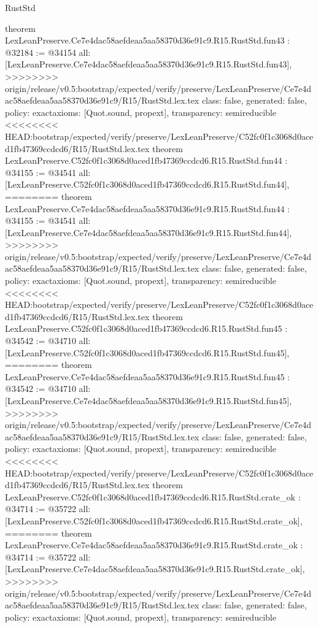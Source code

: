 \begin{lexlean}{RustStd}
\begin{coremodule}
{\begin{coremodule}
{{{{{{{{{{{{{{{{{{{{{{{{{{{{{{{{{{{{{{{{{{{{{{theorem LexLeanPreserve.Ce7e4dac58aefdeaa5aa58370d36e91c9.R15.RustStd.fun43 : @32184 := @34154 {
  all: [LexLeanPreserve.Ce7e4dac58aefdeaa5aa58370d36e91c9.R15.RustStd.fun43],
>>>>>>>> origin/release/v0.5:bootstrap/expected/verify/preserve/LexLeanPreserve/Ce7e4dac58aefdeaa5aa58370d36e91c9/R15/RustStd.lex.tex
  class: false,
  generated: false,
  policy: exact{axioms: [Quot.sound, propext]},
  transparency: semireducible
}
<<<<<<<< HEAD:bootstrap/expected/verify/preserve/LexLeanPreserve/C52fc0f1c3068d0aced1fb47369ccdcd6/R15/RustStd.lex.tex
theorem LexLeanPreserve.C52fc0f1c3068d0aced1fb47369ccdcd6.R15.RustStd.fun44 : @34155 := @34541 {
  all: [LexLeanPreserve.C52fc0f1c3068d0aced1fb47369ccdcd6.R15.RustStd.fun44],
========
theorem LexLeanPreserve.Ce7e4dac58aefdeaa5aa58370d36e91c9.R15.RustStd.fun44 : @34155 := @34541 {
  all: [LexLeanPreserve.Ce7e4dac58aefdeaa5aa58370d36e91c9.R15.RustStd.fun44],
>>>>>>>> origin/release/v0.5:bootstrap/expected/verify/preserve/LexLeanPreserve/Ce7e4dac58aefdeaa5aa58370d36e91c9/R15/RustStd.lex.tex
  class: false,
  generated: false,
  policy: exact{axioms: [Quot.sound, propext]},
  transparency: semireducible
}
<<<<<<<< HEAD:bootstrap/expected/verify/preserve/LexLeanPreserve/C52fc0f1c3068d0aced1fb47369ccdcd6/R15/RustStd.lex.tex
theorem LexLeanPreserve.C52fc0f1c3068d0aced1fb47369ccdcd6.R15.RustStd.fun45 : @34542 := @34710 {
  all: [LexLeanPreserve.C52fc0f1c3068d0aced1fb47369ccdcd6.R15.RustStd.fun45],
========
theorem LexLeanPreserve.Ce7e4dac58aefdeaa5aa58370d36e91c9.R15.RustStd.fun45 : @34542 := @34710 {
  all: [LexLeanPreserve.Ce7e4dac58aefdeaa5aa58370d36e91c9.R15.RustStd.fun45],
>>>>>>>> origin/release/v0.5:bootstrap/expected/verify/preserve/LexLeanPreserve/Ce7e4dac58aefdeaa5aa58370d36e91c9/R15/RustStd.lex.tex
  class: false,
  generated: false,
  policy: exact{axioms: [Quot.sound, propext]},
  transparency: semireducible
}
<<<<<<<< HEAD:bootstrap/expected/verify/preserve/LexLeanPreserve/C52fc0f1c3068d0aced1fb47369ccdcd6/R15/RustStd.lex.tex
theorem LexLeanPreserve.C52fc0f1c3068d0aced1fb47369ccdcd6.R15.RustStd.crate_ok : @34714 := @35722 {
  all: [LexLeanPreserve.C52fc0f1c3068d0aced1fb47369ccdcd6.R15.RustStd.crate_ok],
========
theorem LexLeanPreserve.Ce7e4dac58aefdeaa5aa58370d36e91c9.R15.RustStd.crate_ok : @34714 := @35722 {
  all: [LexLeanPreserve.Ce7e4dac58aefdeaa5aa58370d36e91c9.R15.RustStd.crate_ok],
>>>>>>>> origin/release/v0.5:bootstrap/expected/verify/preserve/LexLeanPreserve/Ce7e4dac58aefdeaa5aa58370d36e91c9/R15/RustStd.lex.tex
  class: false,
  generated: false,
  policy: exact{axioms: [Quot.sound, propext]},
  transparency: semireducible
}}}}}}}}}}}}}}}}}}}}}}}}}}}}}}}}}}}}}}}}}}}}}}}}}}
\end{coremodule}}
\end{coremodule}
\end{lexlean}
